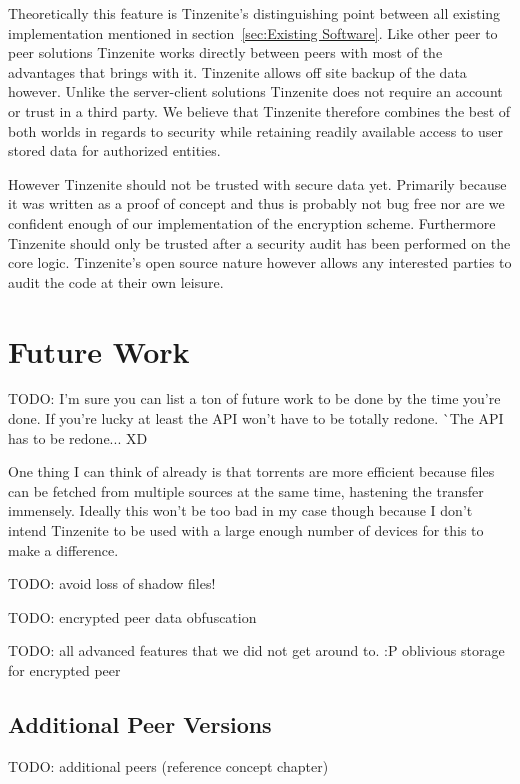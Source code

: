 Theoretically this feature is Tinzenite's distinguishing point between all existing implementation mentioned in section~\ref{sec:Existing Software}.
Like other peer to peer solutions Tinzenite works directly between peers with most of the advantages that brings with it.
Tinzenite allows off site backup of the data however.
Unlike the server-client solutions Tinzenite does not require an account or trust in a third party.
We believe that Tinzenite therefore combines the best of both worlds in regards to security while retaining readily available access to user stored data for authorized entities.

However Tinzenite should not be trusted with secure data yet.
Primarily because it was written as a proof of concept and thus is probably not bug free nor are we confident enough of our implementation of the encryption scheme.
Furthermore Tinzenite should only be trusted after a security audit has been performed on the core logic.
Tinzenite's open source nature however allows any interested parties to audit the code at their own leisure.

\section{Future Work}
\label{sec:Future Work}

TODO: I'm sure you can list a ton of future work to be done by the time you're done.
If you're lucky at least the API won't have to be totally redone.
^^ The API has to be redone... XD

One thing I can think of already is that torrents are more efficient because files can be fetched from multiple sources at the same time, hastening the transfer immensely.
Ideally this won't be too bad in my case though because I don't intend Tinzenite to be used with a large enough number of devices for this to make a difference.

TODO: avoid loss of shadow files!

TODO: encrypted peer data obfuscation

TODO: all advanced features that we did not get around to. :P
oblivious storage for encrypted peer

\subsection{Additional Peer Versions}
\label{sub:Additional Peer Versions}

TODO: additional peers (reference concept chapter)

